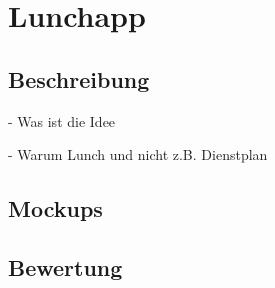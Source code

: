\section{Lunchapp}
\label{section:lunchapp}

\subsection{Beschreibung}

- Was ist die Idee

- Warum Lunch und nicht z.B. Dienstplan


\subsection{Mockups}


\subsection{Bewertung}